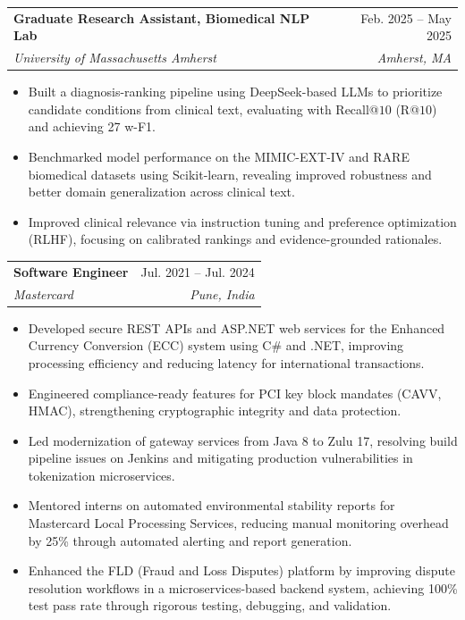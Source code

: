 \documentclass[letterpaper,11pt]{article}
\makeatletter
\newcommand{\resumeItem}[1]{
  \item\small{
    {#1 \vspace{-2pt}}
  }
}
\newcommand{\resumeSubheading}[4]{
  \vspace{-2pt}\item
    \begin{tabular*}{0.97\textwidth}[t]{l@{\extracolsep{\fill}}r}
      \textbf{#1} & #2 \\
      \textit{\small#3} & \textit{\small #4} \\
    \end{tabular*}\vspace{-7pt}
}
\newcommand{\resumeItemListStart}{\begin{itemize}[noitemsep, topsep=0pt, parsep=0pt]}
\newcommand{\resumeItemListEnd}{\end{itemize}\vspace{-5pt}}
\makeatother
\begin{document}
  \resumeSubheading
    {Graduate Research Assistant, Biomedical NLP Lab}{Feb. 2025 -- May 2025}
    {University of Massachusetts Amherst}{Amherst, MA}
    \resumeItemListStart
      \resumeItem{Built a diagnosis-ranking pipeline using DeepSeek-based LLMs to prioritize candidate conditions from clinical text, evaluating with Recall@$10$ (R@$10$) and achieving 27 w-F1.}
      \resumeItem{Benchmarked model performance on the MIMIC-EXT-IV and RARE biomedical datasets using Scikit-learn, revealing improved robustness and better domain generalization across clinical text.}
      \resumeItem{Improved clinical relevance via instruction tuning and preference optimization (RLHF), focusing on calibrated rankings and evidence-grounded rationales.}
    \resumeItemListEnd


  \resumeSubheading
    {Software Engineer}{Jul. 2021 -- Jul. 2024}
    {Mastercard}{Pune, India}
    \resumeItemListStart
      \resumeItem{Developed secure REST APIs and ASP.NET web services for the Enhanced Currency Conversion (ECC) system using C\# and .NET, improving processing efficiency and reducing latency for international transactions.}
      \resumeItem{Engineered compliance-ready features for PCI key block mandates (CAVV, HMAC), strengthening cryptographic integrity and data protection.}
      \resumeItem{Led modernization of gateway services from Java 8 to Zulu 17, resolving build pipeline issues on Jenkins and mitigating production vulnerabilities in tokenization microservices.}
      \resumeItem{Mentored interns on automated environmental stability reports for Mastercard Local Processing Services, reducing manual monitoring overhead by 25\% through automated alerting and report generation.}
      \resumeItem{Enhanced the FLD (Fraud and Loss Disputes) platform by improving dispute resolution workflows in a microservices-based backend system, achieving 100\% test pass rate through rigorous testing, debugging, and validation.}
    \resumeItemListEnd
\end{document}
